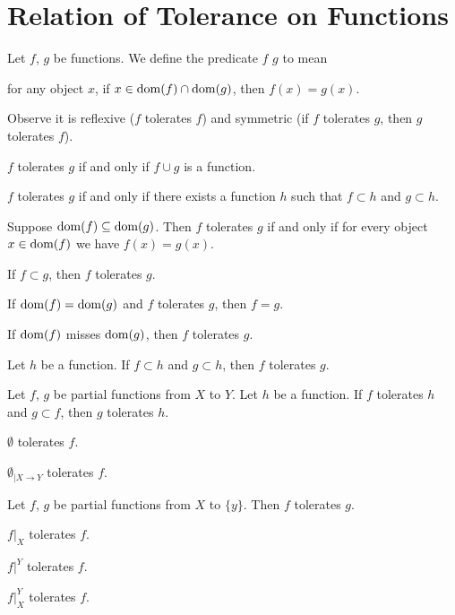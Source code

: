 \documentclass{article}
\begin{document}
\section{Relation of Tolerance on Functions}

\begin{definition}
Let $f$, $g$ be functions.
We define the predicate $f$  $g$ to mean
\begin{defn}
\item for any object $x$, if $x\in\operatorname{dom}(f)\cap\operatorname{dom}(g)$, then $f(x)=g(x)$.
\end{defn}
Observe it is reflexive ($f$ tolerates $f$) and symmetric (if $f$
tolerates $g$, then $g$ tolerates $f$).
\end{definition}

\begin{thm}
\item\label{partfun1:51} $f$ tolerates $g$ if and only if $f\cup g$ is a function.
\item\label{partfun1:52} $f$ tolerates $g$ if and only if there exists a
  function $h$ such that $f\subset h$ and $g\subset h$.
\item\label{partfun1:53} Suppose $\operatorname{dom}(f)\subseteq\operatorname{dom}(g)$.
  Then $f$ tolerates $g$ if and only if for every object $x\in\operatorname{dom}(f)$
  we have $f(x)=g(x)$.
\item\label{partfun1:54} If $f\subset g$, then $f$ tolerates $g$.
\item\label{partfun1:55} If $\operatorname{dom}(f)=\operatorname{dom}(g)$ and $f$ tolerates $g$,
  then $f=g$.
\item\label{partfun1:56} If $\operatorname{dom}(f)$ misses $\operatorname{dom}(g)$,
  then $f$ tolerates $g$.
\item\label{partfun1:57} Let $h$ be a function.
  If $f\subset h$ and $g\subset h$, then $f$ tolerates $g$.
\item\label{partfun1:58} Let $f$, $g$ be partial functions from $X$ to $Y$.
  Let $h$ be a function.
  If $f$ tolerates $h$ and $g\subset f$, then $g$ tolerates $h$.
\item\label{partfun1:59} $\emptyset$ tolerates $f$.
\item\label{partfun1:60} $\emptyset_{|X\to Y}$ tolerates $f$.
\item\label{partfun1:61} Let $f$, $g$ be partial functions from $X$ to
  $\{y\}$. Then $f$ tolerates $g$.
\item\label{partfun1:62} $f|_{X}$ tolerates $f$.
\item\label{partfun1:63} $f|^{Y}$ tolerates $f$.
\item\label{partfun1:64} $f|^{Y}_{X}$ tolerates $f$.

\end{thm}
\end{document}
